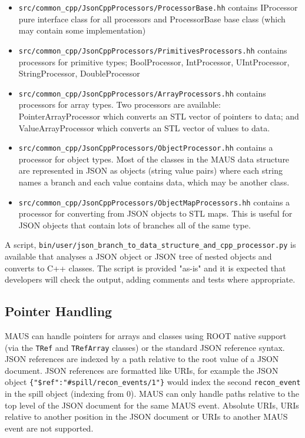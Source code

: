 \begin{itemize}
\item \verb|src/common_cpp/JsonCppProcessors/ProcessorBase.hh| contains IProcessor pure interface class for all processors and ProcessorBase base class (which may contain some implementation)
\item \verb|src/common_cpp/JsonCppProcessors/PrimitivesProcessors.hh| contains processors for primitive types; BoolProcessor, IntProcessor, UIntProcessor, StringProcessor, DoubleProcessor
\item \verb|src/common_cpp/JsonCppProcessors/ArrayProcessors.hh| contains processors for array types. Two processors are available: PointerArrayProcessor which converts an STL vector of pointers to data; and ValueArrayProcessor which converts an STL vector of values to data.
\item \verb|src/common_cpp/JsonCppProcessors/ObjectProcessor.hh| contains a processor for object types. Most of the classes in the MAUS data structure are represented in JSON as objects (string value pairs) where each string names a branch and each value contains data, which may be another class.
\item \verb|src/common_cpp/JsonCppProcessors/ObjectMapProcessors.hh| contains a processor for converting from JSON objects to STL maps. This is useful for JSON objects that contain lots of branches all of the same type.
\end{itemize}

A script, \verb|bin/user/json_branch_to_data_structure_and_cpp_processor.py| is available that analyses a JSON object or JSON tree of nested objects and converts to C++ classes. The script is provided "as-is" and it is expected that developers will check the output, adding comments and tests where appropriate.

\subsection{Pointer Handling}
MAUS can handle pointers for arrays and classes using ROOT native support
(via the \verb|TRef| and \verb|TRefArray| classes)
or the standard JSON reference syntax. 
JSON references are indexed by a path relative to the root value of a JSON document. 
JSON references are formatted like URIs, 
for example the JSON object \verb|{"$ref":"#spill/recon_events/1"}| 
would index the second \verb|recon_event| in the spill object (indexing from 0). 
MAUS can only handle paths relative to the top level of the JSON document for the same MAUS event. 
Absolute URIs, URIs relative to another position in the JSON document or URIs to another MAUS event are not supported. 

